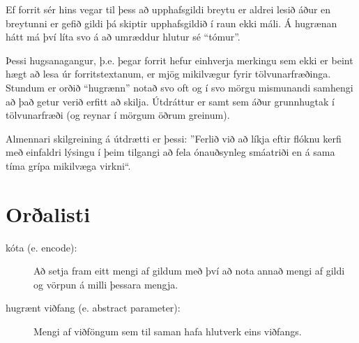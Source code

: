 Ef forrit sér hins vegar til þess að upphafsgildi breytu er aldrei lesið áður en breytunni er gefið gildi
þá skiptir upphafsgildið í raun ekki máli.
Á hugrænan hátt má því líta svo á að umræddur hlutur sé ``tómur''.

Þessi hugsanagangur, þ.e. þegar forrit hefur einhverja merkingu sem ekki er beint hægt að lesa úr forritstextanum,
er mjög mikilvægur fyrir tölvunarfræðinga.
Stundum er orðið ``hugrænn'' notað svo oft og í svo mörgu mismunandi samhengi að það getur verið erfitt að skilja.
Útdráttur er samt sem áður grunnhugtak í tölvunarfræði (og reynar í mörgum öðrum greinum).


Almennari skilgreining á útdrætti er þessi:
''Ferlið við að líkja eftir flóknu kerfi með einfaldri lýsingu í þeim tilgangi að fela
ónauðsynleg smáatriði en á sama tíma grípa mikilvæga virkni``.

\section{Orðalisti}

\begin{description}

\item[kóta (e. encode):]
Að setja fram eitt mengi af gildum með því að nota annað mengi af gildi og vörpun á milli þessara mengja.

\item[hugrænt viðfang (e. abstract parameter):]
Mengi af viðföngum sem til saman hafa hlutverk eins viðfangs.


\end{description}


